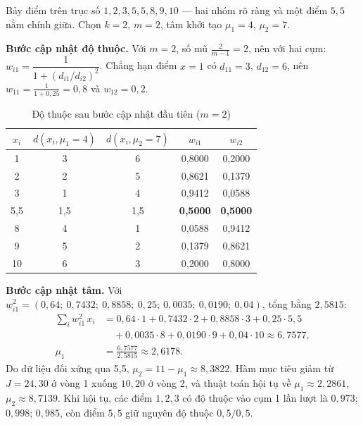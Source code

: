 \begin{example}
Bảy điểm trên trục số $1, 2, 3, 5{,}5, 8, 9, 10$ --- hai nhóm rõ ràng và một điểm $5{,}5$ nằm chính giữa. Chọn $k = 2$, $m = 2$, tâm khởi tạo $\mu_1 = 4$, $\mu_2 = 7$.
\end{example}

\noindent\textbf{Bước cập nhật độ thuộc.} Với $m = 2$, số mũ $\frac{2}{m-1} = 2$, nên với hai cụm: $w_{i1} = \dfrac{1}{1 + (d_{i1}/d_{i2})^2}$. Chẳng hạn điểm $x = 1$ có $d_{11} = 3$, $d_{12} = 6$, nên $w_{11} = \frac{1}{1 + 0{,}25} = 0{,}8$ và $w_{12} = 0{,}2$.

\begin{table}[H]
\centering
\begin{tabular}{|c|c|c|c|c|}
\hline
$x_i$ & $d(x_i, \mu_1 = 4)$ & $d(x_i, \mu_2 = 7)$ & $w_{i1}$ & $w_{i2}$ \\
\hline
1 & 3 & 6 & 0,8000 & 0,2000 \\ \hline
2 & 2 & 5 & 0,8621 & 0,1379 \\ \hline
3 & 1 & 4 & 0,9412 & 0,0588 \\ \hline
5,5 & 1,5 & 1,5 & \textbf{0,5000} & \textbf{0,5000} \\ \hline
8 & 4 & 1 & 0,0588 & 0,9412 \\ \hline
9 & 5 & 2 & 0,1379 & 0,8621 \\ \hline
10 & 6 & 3 & 0,2000 & 0,8000 \\ \hline
\end{tabular}
\caption{Độ thuộc sau bước cập nhật đầu tiên ($m = 2$)}
\label{tab:fcm}
\end{table}

\noindent\textbf{Bước cập nhật tâm.} Với $w_{i1}^2 = (0{,}64;\ 0{,}7432;\ 0{,}8858;\ 0{,}25;\ 0{,}0035;\ 0{,}0190;\ 0{,}04)$, tổng bằng $2{,}5815$:
\begin{align*}
    \textstyle\sum_i w_{i1}^2\,x_i &= 0{,}64 \cdot 1 + 0{,}7432 \cdot 2 + 0{,}8858 \cdot 3 + 0{,}25 \cdot 5{,}5 \\
    &\quad + 0{,}0035 \cdot 8 + 0{,}0190 \cdot 9 + 0{,}04 \cdot 10 \approx 6{,}7577, \\
    \mu_1 &= \frac{6{,}7577}{2{,}5815} \approx 2{,}6178 .
\end{align*}
Do dữ liệu đối xứng qua 5,5, $\mu_2 = 11 - \mu_1 \approx 8{,}3822$. Hàm mục tiêu giảm từ $J = 24{,}30$ ở vòng 1 xuống $10{,}20$ ở vòng 2, và thuật toán hội tụ về $\mu_1 \approx 2{,}2861$, $\mu_2 \approx 8{,}7139$. Khi hội tụ, các điểm $1, 2, 3$ có độ thuộc vào cụm 1 lần lượt là $0{,}973$; $0{,}998$; $0{,}985$, còn điểm $5{,}5$ giữ nguyên độ thuộc \textbf{$0{,}5 / 0{,}5$}.

